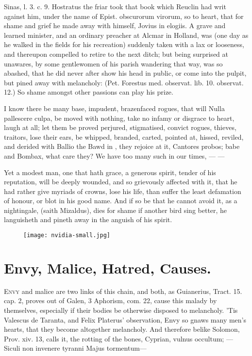 {Sinas, l. 3. c. 9. Hostratus the friar took that book which Reuclin had
writ against him, under the name of Epist. obscurorum virorum, so to
heart, that for shame and grief he made away with himself, Jovius
in elogiis. A grave and learned minister, and an ordinary preacher at
Alcmar in Holland, was (one day as he walked in the fields for his
recreation) suddenly taken with a lax or looseness, and thereupon
compelled to retire to the next ditch; but being surprised at
unawares, by some gentlewomen of his parish wandering that way, was so
abashed, that he did never after show his head in public, or come into
the pulpit, but pined away with melancholy: (Pet. Forestus med.
observat. lib. 10. observat. 12.) So shame amongst other passions can
play his prize.

I know there be many base, impudent, brazenfaced rogues, that will
 Nulla pallescere culpa, be moved with nothing, take no infamy or
disgrace to heart, laugh at all; let them be proved perjured,
stigmatised, convict rogues, thieves, traitors, lose their ears, be
whipped, branded, carted, pointed at, hissed, reviled, and derided with
Ballio the Bawd in \Plautus{}, they rejoice at it, Cantores probos;
babe and Bombax, what care they? We have too many such in our times,
---
---

Yet a modest man, one that hath grace, a generous spirit, tender of his
reputation, will be deeply wounded, and so grievously affected with it,
that he had rather give myriads of crowns, lose his life, than suffer
the least defamation of honour, or blot in his good name. And if so be
that he cannot avoid it, as a nightingale, 
(saith Mizaldus), dies for shame if another bird sing better, he
languisheth and pineth away in the anguish of his spirit.

\cleartoleftpage{}
\begin{figure}[p]
  \begingroup
  \centering
  \texttt{[image: nvidia-small.jpg]}
  \label{fig:invidia}
\end{figure}

\clearpage{}
\thispagestyle{titleontop}

\section{Envy, Malice, Hatred, Causes.}
\lettrine{E}{nvy} and malice are two links of this chain, and both, as Guianerius,
Tract. 15. cap. 2, proves out of Galen, 3 Aphorism, com. 22, 
cause this malady by themselves, especially if their bodies be
otherwise disposed to melancholy. 'Tis Valescus de Taranta, and Felix
Platerus' observation, Envy so gnaws many men's hearts, that they
become altogether melancholy. And therefore belike Solomon, Prov. xiv.
13, calls it, the rotting of the bones, Cyprian, vulnus occultum;
---Siculi non invenere tyranni
Majus tormentum---

}
